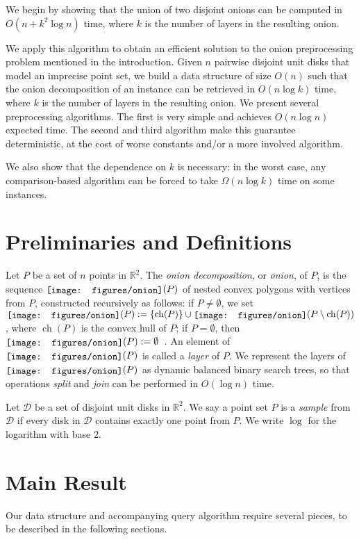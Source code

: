 \documentclass{paper}
\newcommand {\R} {\mathbb {R}}
\newcommand {\eqdef}{:=}
\newcommand {\script} [1] {\ensuremath {\mathcal {#1}}}
\newcommand {\D} {\script {D}}
\DeclareMathOperator{\ch}{ch}
\newcommand {\onion} {\raisebox{-0.25ex}{\texttt{[image: figures/onion]}}}
\begin{document}
We begin by showing that the union of two disjoint onions can be computed in 
$O (n + k^2 \log n)$ time, where $k$ is the number of layers in the
resulting onion.

We apply this algorithm to obtain an efficient solution to the
onion preprocessing problem mentioned in the introduction.
Given $n$ pairwise disjoint unit disks that model
an imprecise point set, we build a data structure of size
$O(n)$ such that the onion decomposition of an instance can be 
retrieved in $O(n \log k)$ time, where $k$ is 
the number of layers in the resulting onion.
We present several preprocessing algorithms. 
The first is very simple and achieves $O(n \log n)$
expected time. The second and third algorithm make this guarantee 
deterministic, at the cost of worse constants and/or a more involved
algorithm.

We also show that the dependence on $k$ is necessary:
in the worst case, any comparison-based algorithm
can be forced to take $\Omega (n \log k)$ time on some instances.

\section {Preliminaries and Definitions}

Let $P$ be a set of $n$ points in $\R^2$. 
The \emph {onion decomposition}, or \emph {onion}, of $P$, is the 
sequence $\onion(P)$ of nested convex polygons with vertices 
from $P$, 
constructed recursively as follows:
if $P \neq \emptyset$,  we set 
$\onion(P) \eqdef \{\ch(P)\} \cup \onion(P \setminus \ch(P))$,
where $\ch(P)$ is the convex hull of $P$;
if $P = \emptyset$, then 
$\onion(P) \eqdef \emptyset$~\cite {c-clps-85}.
An element of $\onion(P)$ is called a \emph{layer} of $P$.
We represent the layers of $\onion(P)$ as dynamic balanced binary search
trees, so that operations \emph{split} and \emph{join} can be performed
in $O(\log n)$ time.

Let $\D$ be a set of disjoint unit disks in $\R^2$. We say a point set 
$P$ is a \emph {sample} from $\D$ if every disk in $\D$ contains
exactly one point from $P$. 
We write $\log$ for the logarithm with base $2$.

\section {Main Result}

Our data structure and accompanying query algorithm require several pieces, to be described in the
following sections.
\end{document}
